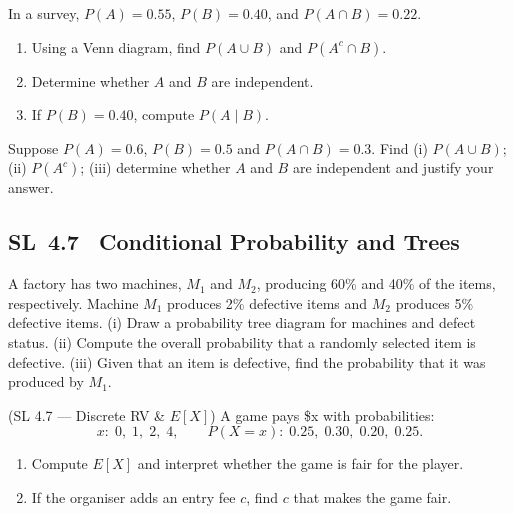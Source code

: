 \documentclass[11pt]{article}
\def\textbf#1{#1}%
\newcommand{\tocsubsection}[1]{\subsection{#1}}
\newcounter{question}
\begin{document}
\begin{question}
In a survey, $P(A)=0.55$, $P(B)=0.40$, and $P(A\cap B)=0.22$.
\begin{enumerate}
  \item Using a Venn diagram, find $P(A\cup B)$ and $P(A^c\cap B)$.
  \item Determine whether $A$ and $B$ are independent.
  \item If $P(B)=0.40$, compute $P(A\mid B)$.
\end{enumerate}
\begin{center}
\end{center}
\end{question}


\begin{question}
Suppose $P(A)=0.6$, $P(B)=0.5$ and $P(A\cap B)=0.3$.  Find (i) $P(A\cup B)$;
(ii) $P(A^c)$; (iii) determine whether $A$ and $B$ are independent and
justify your answer.
\end{question}

\tocsubsection{SL 4.7 \; Conditional Probability and Trees}

\begin{question}
A factory has two machines, $M_1$ and $M_2$, producing 60\% and 40\% of the
items, respectively.  Machine $M_1$ produces 2\% defective items and $M_2$
produces 5\% defective items.  (i) Draw a probability tree diagram for
machines and defect status.  (ii) Compute the overall probability that a
randomly selected item is defective.  (iii) Given that an item is defective,
find the probability that it was produced by $M_1$.
\end{question}

\begin{question}
\textbf{(SL 4.7 — Discrete RV \& $E[X]$)} A game pays \$x with probabilities:
\[
x:\; 0,\;1,\;2,\;4,\qquad P(X=x):\;0.25,\;0.30,\;0.20,\;0.25.
\]
\begin{enumerate}
  \item Compute $E[X]$ and interpret whether the game is fair for the player.
  \item If the organiser adds an entry fee $c$, find $c$ that makes the game fair.
\end{enumerate}
\end{question}
\end{document}
